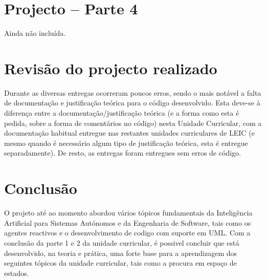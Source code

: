 \documentclass[a4paper,12pt]{article}
\begin{document}
\newpage
\section{Projecto – Parte 4}
Ainda não incluída.

\newpage
\section{Revisão do projecto realizado}
Durante as diversas entregas ocorreram poucos erros, sendo o mais notável a falta de documentação e justificação teórica para o código desenvolvido. Esta deve-se à diferença entre a documentação/justificação teórica (e a forma como esta é pedida, sobre a forma de comentários no código) nesta Unidade Curricular, com a documentação habitual entregue nas restantes unidades curriculares de LEIC (e mesmo quando é necessário algum tipo de justificação teórica, esta é entregue separadamente). De resto, as entregas foram entregues sem erros de código.

\newpage
\section{Conclusão}
O projeto até ao momento abordou vários tópicos fundamentais da Inteligência Artificial para Sistemas Autónomos e da Engenharia de Software, tais como os agentes reactivos e o desenvolvimento de codigo com suporte em UML.
Com a conclusão da parte 1 e 2 da unidade curricular, é possivel concluir que está desenvolvido, na teoria e prática, uma forte base para a aprendizagem dos seguintes tópicos da unidade curricular, tais como a procura em espaço de estados.

\newpage
\nocite{*}
\printbibliography[heading=bibintoc]
\end{document}

